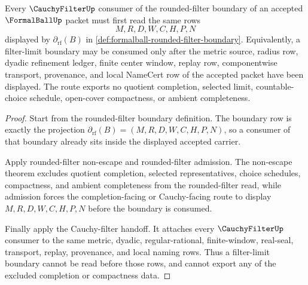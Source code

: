 \begin{theorem}
\label{thm:formalball-rounded-filter-cauchyfilter-boundary}
Every $\CauchyFilterUp$ consumer of the rounded-filter boundary of an accepted $\FormalBallUp$ packet must first read the same rows
$$
M,R,D,W,C,H,P,N
$$
displayed by $\partial_{\mathrm{rf}}(B)$ in \autoref{def:formalball-rounded-filter-boundary}. Equivalently, a filter-limit boundary may be consumed only after the metric source, radius row, dyadic refinement ledger, finite center window, replay row, componentwise transport, provenance, and local NameCert row of the accepted packet have been displayed. The route exports no quotient completion, selected limit, countable-choice schedule, open-cover compactness, or ambient completeness.
\end{theorem}
\begin{proof}
Start from the rounded-filter boundary definition. The boundary row is exactly the projection $\partial_{\mathrm{rf}}(B)=(M,R,D,W,C,H,P,N)$, so a consumer of that boundary already sits inside the displayed accepted carrier.

Apply rounded-filter non-escape and rounded-filter admission. The non-escape theorem excludes quotient completion, selected representatives, choice schedules, compactness, and ambient completeness from the rounded-filter read, while admission forces the completion-facing or Cauchy-facing route to display $M,R,D,W,C,H,P,N$ before the boundary is consumed.

Finally apply the Cauchy-filter handoff. It attaches every $\CauchyFilterUp$ consumer to the same metric, dyadic, regular-rational, finite-window, real-seal, transport, replay, provenance, and local naming rows. Thus a filter-limit boundary cannot be read before those rows, and cannot export any of the excluded completion or compactness data.
\end{proof}


